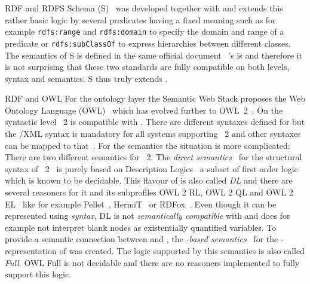 \begin{paragraph}{RDF and RDFS}
\rdf Schema (\rdf{}S)~\cite{RDFS} was developed together with \rdf and extends this rather basic logic by several predicates having a fixed meaning such as for example 
\texttt{rdfs:range} and \texttt{rdfs:domain} to specify the domain and range of a predicate or \texttt{rdfs:subClassOf} to express hierarchies between different classes.
The semantics of \rdf{}S is defined in the same official document~\cite{RDFSemantics} \rdf's is and therefore it is not surprising that these two standards are fully compatible
on both levels, syntax and semantics. 
\rdf{}S thus truly extends \rdf. 
\end{paragraph}

\begin{paragraph}{RDF and OWL}
For the ontology layer the Semantic Web Stack proposes the Web Ontology Language (OWL)~\cite{owlold} which has evolved further to \linebreak OWL~2~\cite{owl}. 
On the syntactic level \owl~2 is compatible with \rdf. There are different syntaxes defined for \owl but the \rdf{}/XML syntax is mandatory for all 
systems supporting \owl~2 and other 
syntaxes can be mapped to that~\cite{owltordf}.
For the semantics the situation is more complicated: There are two different semantics for \owl~2. 
The \emph{direct semantics}~\cite{owldsem} for the structural syntax of \owl~2~\cite{owlsyn1} is purely based on Description Logics~\cite{dl} a subset of first order logic
which is known 
to be decidable.
This flavour of  is also called \emph{\owl DL} and there are several reasoners for it and its subprofiles OWL 2 RL, OWL 2 QL and OWL 2 EL~\cite{OWLRL}
like for example Pellet~\cite{Pellet}, HermiT~\cite{hermit} or RDFox~\cite{rdfox}.  
Even though it can be represented using \rdf \emph{syntax}, \owl DL is not \emph{semantically compatible} with \rdf and 
does for example not interpret blank nodes as existentially quantified variables.
To provide a semantic connection between \owl and \rdf, 
the \emph{\rdf-based semantics}~\cite{owlrdfsem} for the \rdf-representation of  was created. %
The logic supported by this semantics is also called \emph{\owl Full}. OWL Full is not decidable and there are no reasoners implemented to fully support 
this logic. 
\end{paragraph}


